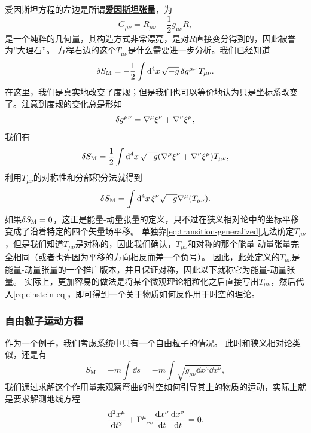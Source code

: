 \documentclass[hyperref, UTF8, a4paper]{ctexart}
\newcommand*{\concept}[1]{\underline{\textbf{#1}}}
\begin{document}
爱因斯坦方程的左边是所谓\concept{爱因斯坦张量}，为
\begin{equation}
    G_{\mu \nu} = R_{\mu \nu} - \frac{1}{2} g_{\mu \nu} R,
\end{equation}
是一个纯粹的几何量，其构造方式非常漂亮，是对$R$直接变分得到的，因此被誉为”大理石”。
方程右边的这个$T_{\mu \nu}$是什么需要进一步分析。我们已经知道
\[
    \var{S_\text{M}} = - \frac{1}{2} \int \dd[4]{x} \sqrt{-g} \var{g^{\mu \nu}} T_{\mu \nu}.
\]
在这里，我们是真实地改变了度规；但是我们也可以等价地认为只是坐标系改变了。注意到度规的变化总是形如
\[
    \var{g^{\mu \nu}} = \nabla^\mu \xi^\nu + \nabla^\nu \xi^\mu,
\]
我们有
\[
    \var{S_\text{M}} = \frac{1}{2} \int \dd[4]{x} \sqrt{-g} (\nabla^\mu \xi^\nu + \nabla^\nu \xi^\mu) T_{\mu \nu},
\]
利用$T_{\mu \nu}$的对称性和分部积分法就得到
\begin{equation}
    \var{S_\text{M}} = \int \dd[4]{x} \xi^\nu \sqrt{-g} \nabla^{\mu} (T_{\mu \nu}).
    \label{eq:transition-generalized}
\end{equation}
如果$\var{S_\text{M}}=0$，这正是能量-动量张量的定义，只不过在狭义相对论中的坐标平移变成了沿着特定的四个矢量场平移。
单独靠\eqref{eq:transition-generalized}无法确定$T_{\mu \nu}$，但是我们知道$T_{\mu \nu}$是对称的，因此我们确认，$T_{\mu \nu}$和对称的那个能量-动量张量完全相同（或者也许因为平移的方向相反而差一个负号）。
因此，此处定义的$T_{\mu \nu}$是能量-动量张量的一个推广版本，并且保证对称，因此以下就称它为能量-动量张量。
实际上，更加容易的做法是将某个微观理论粗粒化之后直接写出$T_{\mu \nu}$，然后代入\eqref{eq:einstein-eq}，即可得到一个关于物质如何反作用于时空的理论。

\subsubsection{自由粒子运动方程}

作为一个例子，我们考虑系统中只有一个自由粒子的情况。
此时和狭义相对论类似，还是有
\begin{equation}
    S_\text{M} = - m \int \dd{s} = - m \int \sqrt{g_{\mu \nu} \dd{x^\mu} \dd{x^\nu}},
    \label{eq:free-particle}
\end{equation}
我们通过求解这个作用量来观察弯曲的时空如何引导其上的物质的运动，实际上就是要求解测地线方程
\begin{equation}
    \dv[2]{x^\mu}{t} + \Gamma\indices{^\mu_{\nu \sigma}} \dv{x^\nu}{t} \dv{x^\sigma}{t} = 0.
\end{equation}
\end{document}
